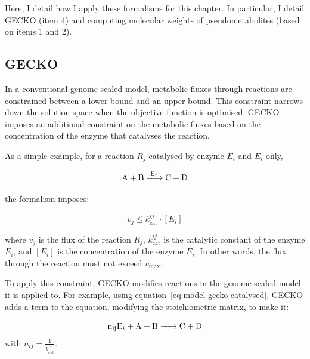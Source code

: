 Here, I detail how I apply these formalisms for this chapter.
In particular, I detail GECKO (item 4) and computing molecular weights of pseudometabolites (based on items 1 and 2).

\subsection{GECKO}
\label{subsec:model-yeast8-gecko}

In a conventional genome-scaled model, metabolic fluxes through reactions are constrained between a lower bound and an upper bound.
This constraint narrows down the solution space when the objective function is optimised.
GECKO imposes an additional constraint on the metabolic fluxes based on the concentration of the enzyme that catalyses the reaction.

As a simple example, for a reaction $R_{j}$ catalysed by enzyme $E_{i}$ and $E_{i}$ only,

\begin{equation}
  \ce{ A + B ->[E_{i}] C + D }
  \label{eq:model-gecko-catalysed}
\end{equation}

the formalism imposes:

\begin{equation}
  v_{j} \leq k_{\mathrm{cat}}^{ij} \cdot [E_{i}]
  \label{eq:model-gecko-kcat}
\end{equation}

where $v_{j}$ is the flux of the reaction $R_{j}$, $k_{\mathrm{cat}}^{ij}$ is the catalytic constant of the enzyme $E_{i}$, and $[E_{i}]$ is the concentration of the enzyme $E_{i}$.
In other words, the flux through the reaction must not exceed $v_{\mathrm{max}}$.

To apply this constraint, GECKO modifies reactions in the genome-scaled model it is applied to.
For example, using equation~\ref{eq:model-gecko-catalysed},
GECKO adds a term to the equation, modifying the stoichiometric matrix, to make it:

\begin{equation}
  \ce{ n_{ij}E_{i} + A + B -> C + D }
  \label{eq:model-gecko-catalysed-formalism}
\end{equation}
with $n_{ij} = \frac{1}{k_{\mathrm{cat}}^{ij}}$.

